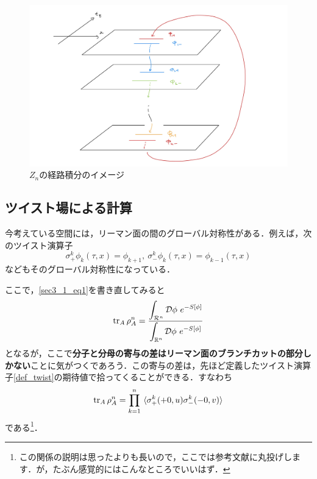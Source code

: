 \documentclass[a4paper,uplatex,dvipdfmx]{jsarticle}
\theoremstyle{definition}
\begin{document}
\begin{figure}[ht]
  \centering
  \includegraphics[keepaspectratio,width=0.8\linewidth]{fig/replica.jpg}
  \caption{$Z_{n}$の経路積分のイメージ}
\end{figure}


\subsection{ツイスト場による計算}

今考えている空間には，リーマン面の間のグローバル対称性がある．例えば，次のツイスト演算子
\begin{equation}
  \sigma_{+}^{k}\phi_{k}(\tau,x)
  =
  \phi_{k+1}
  ,\ 
  \sigma_{-}^{k}\phi_{k}(\tau,x)  
  =
  \phi_{k-1}(\tau,x)
  \label{def_twist}
\end{equation}
などもそのグローバル対称性になっている．

ここで，\eqref{sec3_1_eq1}を書き直してみると
\begin{equation}
  \tr_{A}\rho_{A}^{n}
  =
  \dfrac{\displaystyle
    \int_{\mathcal{R}^{n}}\mathcal{D}\phi\ 
    e^{-S[\phi]}
  }{\displaystyle
    \int_{\mathbb{R}^{n}}\mathcal{D}\phi\ 
    e^{-S[\phi]}
  }
\end{equation}
となるが，ここで\textbf{分子と分母の寄与の差はリーマン面のブランチカットの部分しかない}ことに気がつくであろう．この寄与の差は，先ほど定義したツイスト演算子\eqref{def_twist}の期待値で拾ってくることができる\cite{Lunin_CorrelationFunctions_2001}．すなわち
\begin{equation}  
  \tr_{A}\rho_{A}^{n}
  =
  \prod_{k=1}^{n}
  \ev*{\sigma_{+}^{k}(+0,u)\sigma_{-}^{k}(-0,v)}
\end{equation}
である\footnote{
  この関係の説明は思ったよりも長いので，ここでは参考文献\cite{Lunin_CorrelationFunctions_2001}に丸投げします．が，たぶん感覚的にはこんなところでいいはず．
}．
\end{document}
